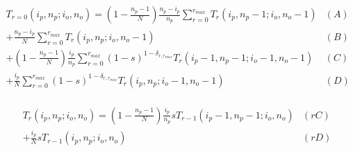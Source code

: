 \documentclass[preview]{standalone}
\newcommand{\Coalc}[4]{\left(#1, #2 ; #3, #4 \right)}
\begin{document}
\begin{equation*}
  \begin{aligned}
    T_{r=0}\Coalc{i_p}{n_p}{i_o}{n_o}
    = \left(1-\frac{n_p-1}{N}\right) \frac{n_p-i_p}{n_p} \sum_{r=0}^{r_{max}}                              T_{r}\Coalc{i_p  }{n_p-1}{i_o  }{n_o-1} & (A) \\
    +                                \frac{n_p-i_p}{N}   \sum_{r=0}^{r_{max}}                              T_{r}\Coalc{i_p  }{n_p  }{i_o  }{n_o-1} & (B) \\
    + \left(1-\frac{n_p-1}{N}\right) \frac{i_p}{n_p}     \sum_{r=0}^{r_{max}} (1-s)^{1-\delta_{r,r_{max}}} T_{r}\Coalc{i_p-1}{n_p-1}{i_o-1}{n_o-1} & (C) \\
    +                                \frac{i_p}{N}       \sum_{r=0}^{r_{max}} (1-s)^{1-\delta_{r,r_{max}}} T_{r}\Coalc{i_p  }{n_p  }{i_o-1}{n_o-1} & (D) \\
  \end{aligned}
\end{equation*}

\begin{equation*}
  \begin{aligned}
    T_{r}\Coalc{i_p}{n_p}{i_o}{n_o}
    = \left(1-\frac{n_p-1}{N}\right) \frac{i_p}{n_p} s T_{r-1} \Coalc{i_p-1}{n_p-1}{i_o}{n_o}& (rC) \\
    +                                \frac{i_p}{N}   s T_{r-1} \Coalc{i_p  }{n_p  }{i_o}{n_o}& (rD) \\
  \end{aligned}
\end{equation*}
\end{document}
